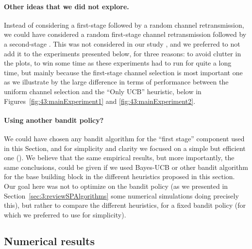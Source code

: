 \paragraph{Other ideas that we did not explore.}
%
Instead of considering a first-stage \UCB{} followed by a random channel retransmission, we could have considered a random first-stage channel retransmission followed by a second-stage \UCB.
This was not considered in our study \cite{Bonnefoi2019WCNC}, and we preferred to not add it to the experiments presented below, for three reasons: to avoid clutter in the plots, to win some time as these experiments had to run for quite a long time, but mainly because the first-stage channel selection is most important one as we illustrate by the large difference in terms of performance between the uniform channel selection and the ``Only UCB'' heuristic, below in Figures~\ref{fig:43:mainExperiment1} and \ref{fig:43:mainExperiment2}.


\paragraph{Using another bandit policy?}
%
We could have chosen any bandit algorithm for the ``first stage'' component used in this Section, and for simplicity and clarity we focused on a simple but efficient one (\UCB).
We believe that the same empirical results, but more importantly, the same conclusions, could be given if we used Bayes-UCB or other bandit algorithm for the base building block in the different heuristics proposed in this section.
Our goal here was not to optimize on the bandit policy (as we presented in Section~\ref{sec:3:reviewSPAlgorithms} some numerical simulations doing precisely this), but rather to compare the different heuristics, for a fixed bandit policy (for which we preferred to use \UCB{} for simplicity).


\subsection{Numerical results}
\label{sub:43:numExp}

